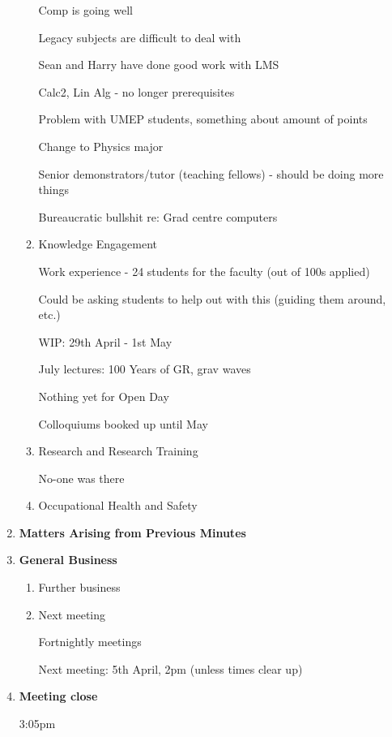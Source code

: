 \documentclass[a4paper,12pt]{article}
\newcommand{\itemi}[1]{\bf\large #1}
\begin{document}
\begin{enumerate}
\begin{enumerate}
	Comp is going well	
	
	Legacy subjects are difficult to deal with
	
	Sean and Harry have done good work with LMS
	
	Calc2, Lin Alg - no longer prerequisites
	
	Problem with UMEP students, something about amount of points
	
	Change to Physics major
	
	Senior demonstrators/tutor (teaching fellows) - should be doing more things	
	
	Bureaucratic bullshit re: Grad centre computers
	
	\item Knowledge Engagement

	Work experience - 24 students for the faculty (out of 100s applied)
	
	Could be asking students to help out with this (guiding them around, etc.)
	
	WIP: 29th April - 1st May	
	
	July lectures: 100 Years of GR, grav waves
	
	Nothing yet for Open Day
	
	Colloquiums booked up until May	
	
	\item Research and Research Training

	No-one was there	
	
	\item Occupational Health and Safety

		
	
	\end{enumerate}
\item {\itemi Matters Arising from Previous Minutes}
\item {\itemi General Business}
	\begin{enumerate}
	\item Further business
	\item Next meeting
	
	Fortnightly meetings
	
	Next meeting: 5th April, 2pm (unless times clear up)	
	
	\end{enumerate}
\item {\itemi Meeting close}

	3:05pm
\end{enumerate}
\end{document}
